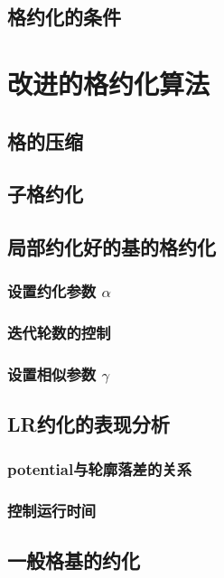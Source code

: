 \documentclass[UTF8]{ctexart}
\begin{document}
    \subsection{格约化的条件}


\section{改进的格约化算法}

    \subsection{格的压缩}

    \subsection{子格约化}

    \subsection{局部约化好的基的格约化}

        \subsubsection{设置约化参数 $ \alpha $}

        \subsubsection{迭代轮数的控制}

        \subsubsection{设置相似参数 $\gamma$}

    \subsection{LR约化的表现分析}

        \subsubsection{potential与轮廓落差的关系}

        \subsubsection{控制运行时间}

    \subsection{一般格基的约化}
\fi
\end{document}
